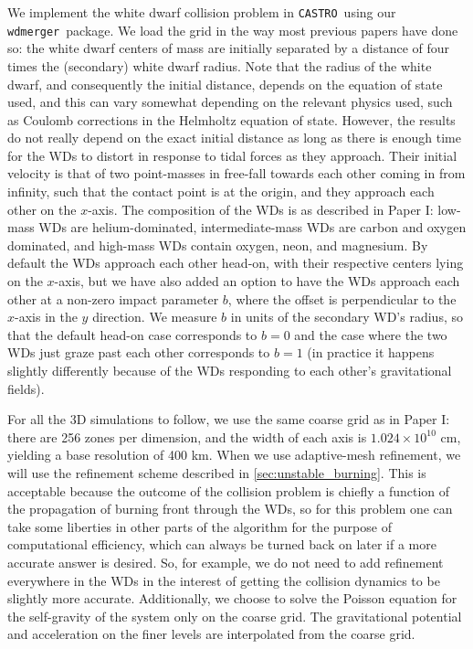 \documentclass[twocolumn,numberedappendix]{../aastex6}
\newcommand{\castro}{\texttt{CASTRO}}
\newcommand{\wdmerger}{\texttt{wdmerger}}
\begin{document}
We implement the white dwarf collision problem in \castro\ using our \wdmerger\
package. We load the grid in the way most previous papers have done so:
the white dwarf centers of mass are initially separated by a distance of four times
the (secondary) white dwarf radius. Note that the radius of the white dwarf, and
consequently the initial distance, depends on the equation of state used, and this
can vary somewhat depending on the relevant physics used, such as Coulomb corrections
in the Helmholtz equation of state. However, the results do not really depend on the
exact initial distance as long as there is enough time for the WDs to distort in
response to tidal forces as they approach. Their initial velocity is that of
two point-masses in free-fall towards each other coming in from infinity, such that
the contact point is at the origin, and they approach each other on the $x$-axis.
The composition of the WDs is as described in Paper I: low-mass WDs are helium-dominated,
intermediate-mass WDs are carbon and oxygen dominated, and high-mass WDs contain
oxygen, neon, and magnesium. By default the WDs approach each other head-on, with
their respective centers lying on the $x$-axis, but we have also added an option
to have the WDs approach each other at a non-zero impact parameter $b$, where the
offset is perpendicular to the $x$-axis in the $y$ direction. We measure
$b$ in units of the secondary WD's radius, so that the default head-on case
corresponds to $b = 0$ and the case where the two WDs just graze past each other
corresponds to $b = 1$ (in practice it happens slightly differently because
of the WDs responding to each other's gravitational fields).

For all the 3D simulations to follow, we use the same coarse grid as in Paper I:
there are 256 zones per dimension, and the width of each axis is $1.024 \times 10^{10}$
cm, yielding a base resolution of 400 km. When we use adaptive-mesh refinement, we will
use the refinement scheme described in \autoref{sec:unstable_burning}. This is
acceptable because the outcome of the collision problem is chiefly a function
of the propagation of burning front through the WDs, so for this problem one
can take some liberties in other parts of the algorithm for the purpose of
computational efficiency, which can always be turned back on later if a more
accurate answer is desired. So, for example, we do not need to add refinement
everywhere in the WDs in the interest of getting the collision dynamics to be
slightly more accurate. Additionally, we choose to solve the Poisson equation
for the self-gravity of the system only on the coarse grid. The gravitational
potential and acceleration on the finer levels are interpolated from the coarse
grid.
\end{document}
